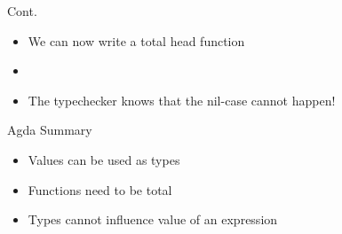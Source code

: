 \begin{frame}[fragile]{Cont.}
\begin{itemize}
\item We can now write a total head function
\item \begin{code}
\> \AgdaSymbol{:}  \AgdaSymbol{\{} \AgdaSymbol{\}}    \AgdaSymbol{(} \AgdaSymbol{)}  \<%
\\
\> \AgdaSymbol{(}  \AgdaSymbol{)} \AgdaSymbol{=} \<%
\end{code}
\item The typechecker knows that the nil-case cannot happen!
\end{itemize}
\end{frame}

\begin{frame}{Agda Summary}
\begin{itemize}
\item Values can be used as types
\item Functions need to be total
\item Types cannot influence value of an expression
\end{itemize}
\end{frame}
